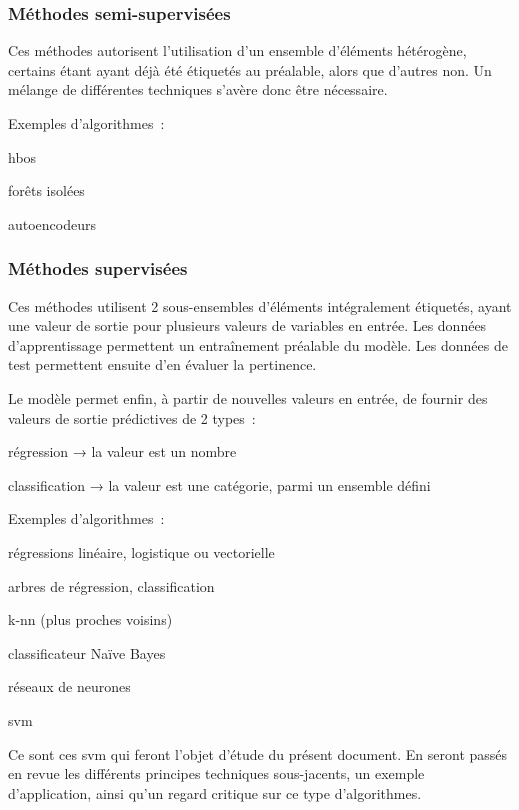 \subsubsection{Méthodes semi-supervisées}

Ces méthodes autorisent l’utilisation d’un ensemble d’éléments hétérogène,
certains étant ayant déjà été étiquetés au préalable, alors que d’autres non.
Un mélange de différentes techniques s’avère donc être nécessaire.

Exemples d’algorithmes :
\begin{itmz}
\item{\gls{hbos}}
\item{forêts isolées}
\item{autoencodeurs}
\end{itmz}

\subsubsection{Méthodes supervisées}

Ces méthodes utilisent 2 sous-ensembles d’éléments intégralement étiquetés,
ayant une valeur de sortie pour plusieurs valeurs de variables en entrée.
Les données d’apprentissage permettent un entraînement préalable du modèle.
Les données de test permettent ensuite d’en évaluer la pertinence.

Le modèle permet enfin, à partir de nouvelles valeurs en entrée,
de fournir des valeurs de sortie prédictives de 2 types :
\begin{itmz}
\item{régression → la valeur est un nombre}
\item{classification → la valeur est une catégorie, parmi un ensemble défini}
\end{itmz}

Exemples d’algorithmes :
\begin{itmz}
\item{régressions linéaire, logistique ou vectorielle}
\item{arbres de régression, classification}
\item{k-\gls{nn} (plus proches voisins)}
\item{classificateur Naïve Bayes}
\item{réseaux de neurones}
\item{\gls{svm}}
\end{itmz}

Ce sont ces \gls{svm} qui feront l’objet d’étude du présent document.
En seront passés en revue les différents principes techniques sous-jacents,
un exemple d’application, ainsi qu’un regard critique sur ce type d’algorithmes.

\pagebreak
